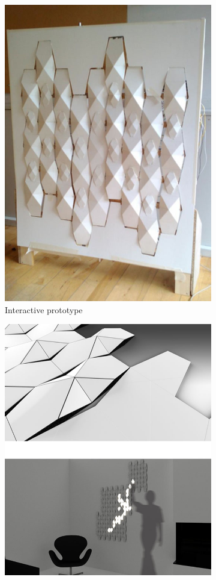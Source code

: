 \begin{figure}
	\centering
	\begin{subfigure}{.46\textwidth}
		\centering
		\includegraphics[width=.9\linewidth]{figures/beomotion/prototype}
		\caption{Interactive prototype}
	\end{subfigure}%
	\begin{subfigure}{.54\textwidth}
		\centering
		\includegraphics[width=.9\linewidth]{figures/beomotion/concepts}

\end{subfigure}
\end{figure}
